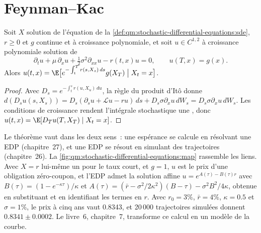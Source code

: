 \section{Feynman--Kac}

\begin{theorem}\label{thm:qm:stochastic-differential-equations:fk}
Soit $X$ solution de l'équation de la \cref{def:qm:stochastic-differential-equations:sde}, $r \ge 0$ et $g$
continue et à croissance polynomiale, et soit $u \in C^{1,2}$ à croissance polynomiale solution de
\[
\partial_tu + \mu\,\partial_xu + \tfrac12\sigma^2\partial_{xx}u - r(t,x)u = 0, \qquad u(T, x) = g(x).
\]
Alors $u(t, x) = \E\bigl[e^{-\int_t^Tr(s, X_s)\,ds}g(X_T) \bigm| X_t = x\bigr]$.
\end{theorem}

\begin{proof}
Avec $D_s = e^{-\int_t^sr(u, X_u)\,du}$, la règle du produit d'Itô donne $d(D_su(s, X_s)) = D_s(\partial_su +
\mathcal Lu - ru)\,ds + D_s\sigma\partial_xu\,dW_s = D_s\sigma\partial_xu\,dW_s$. Les conditions de croissance rendent
l'intégrale stochastique une , donc $u(t, x) = \E[D_Tu(T, X_T) \mid X_t = x]$.
\end{proof}

Le théorème vaut dans les deux sens~: une espérance se calcule en résolvant une EDP (chapitre~27), et une
EDP se résout en simulant des trajectoires (chapitre~26). La \cref{fig:qm:stochastic-differential-equations:map} rassemble les liens.
Avec $X = r$ lui-même un  pour le taux court, et $g = 1$, $u$ est le
prix d'une obligation zéro-coupon, et l'EDP admet la solution affine $u = e^{A(\tau) - B(\tau)r}$ avec
$B(\tau) = (1 - e^{-\kappa\tau})/\kappa$ et $A(\tau) = (\bar r - \sigma^2/2\kappa^2)(B - \tau) - \sigma^2B^2/4\kappa$,
obtenue en substituant et en identifiant les termes en $r$. Avec $r_0 = 3\%$, $\bar r = 4\%$, $\kappa = 0.5$
et $\sigma = 1\%$, le prix à cinq ans vaut 0.8343, et 20\,000 trajectoires simulées donnent $0.8341 \pm 0.0002$.
Le livre~6, chapitre~7, transforme ce calcul en un modèle de la courbe.

